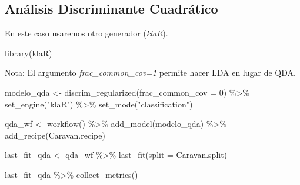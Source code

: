 \documentclass[
  12pt,
]{book}
\newenvironment{Shaded}{\begin{snugshade}}{\end{snugshade}}
\newcommand{\AttributeTok}[1]{\textcolor[rgb]{0.77,0.63,0.00}{#1}}
\newcommand{\DecValTok}[1]{\textcolor[rgb]{0.00,0.00,0.81}{#1}}
\newcommand{\FunctionTok}[1]{\textcolor[rgb]{0.00,0.00,0.00}{#1}}
\newcommand{\NormalTok}[1]{#1}
\newcommand{\OtherTok}[1]{\textcolor[rgb]{0.56,0.35,0.01}{#1}}
\newcommand{\SpecialCharTok}[1]{\textcolor[rgb]{0.00,0.00,0.00}{#1}}
\newcommand{\StringTok}[1]{\textcolor[rgb]{0.31,0.60,0.02}{#1}}
\begin{document}
\hypertarget{anuxe1lisis-discriminante-cuadruxe1tico-1}{%
\subsection{Análisis Discriminante
Cuadrático}\label{anuxe1lisis-discriminante-cuadruxe1tico-1}}

En este caso usaremos otro generador (\emph{klaR}).

\begin{Shaded}
\begin{Highlighting}[]
\FunctionTok{library}\NormalTok{(klaR)}
\end{Highlighting}
\end{Shaded}

Nota: El argumento \emph{frac\_common\_cov=1} permite hacer LDA en lugar
de QDA.

\begin{Shaded}
\begin{Highlighting}[]
\NormalTok{modelo\_qda }\OtherTok{\textless{}{-}} \FunctionTok{discrim\_regularized}\NormalTok{(}\AttributeTok{frac\_common\_cov =} \DecValTok{0}\NormalTok{) }\SpecialCharTok{\%\textgreater{}\%}
    \FunctionTok{set\_engine}\NormalTok{(}\StringTok{"klaR"}\NormalTok{) }\SpecialCharTok{\%\textgreater{}\%}
    \FunctionTok{set\_mode}\NormalTok{(}\StringTok{"classification"}\NormalTok{)}
\end{Highlighting}
\end{Shaded}

\begin{Shaded}
\begin{Highlighting}[]
\NormalTok{qda\_wf }\OtherTok{\textless{}{-}} \FunctionTok{workflow}\NormalTok{() }\SpecialCharTok{\%\textgreater{}\%}
    \FunctionTok{add\_model}\NormalTok{(modelo\_qda) }\SpecialCharTok{\%\textgreater{}\%}
    \FunctionTok{add\_recipe}\NormalTok{(Caravan.recipe)}

\NormalTok{last\_fit\_qda }\OtherTok{\textless{}{-}}\NormalTok{ qda\_wf }\SpecialCharTok{\%\textgreater{}\%}
    \FunctionTok{last\_fit}\NormalTok{(}\AttributeTok{split =}\NormalTok{ Caravan.split)}
\end{Highlighting}
\end{Shaded}

\begin{Shaded}
\begin{Highlighting}[]
\NormalTok{last\_fit\_qda }\SpecialCharTok{\%\textgreater{}\%}
    \FunctionTok{collect\_metrics}\NormalTok{()}
\end{Highlighting}
\end{Shaded}
\end{document}
